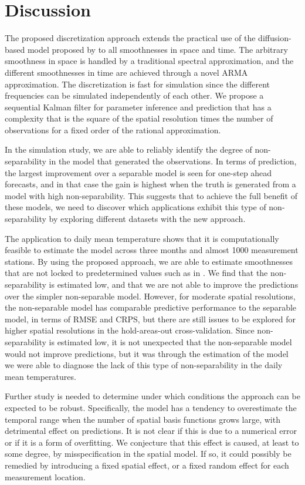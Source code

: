 \documentclass[12pt]{article} %
\begin{document}
\section{Discussion}\label{sec:Discussion}
The proposed discretization approach extends the practical use of the diffusion-based model proposed by \citet{LindgrenBakka} to all smoothnesses in space and time. The arbitrary smoothness in space is handled by a traditional spectral approximation, and the different smoothnesses in time are achieved through a novel ARMA approximation. The discretization is fast for simulation since the different frequencies can be simulated independently of each other. We propose a sequential Kalman filter for parameter inference and prediction that has a complexity that is the square of the spatial resolution times the number of observations for a fixed order of the rational approximation.  

In the simulation study, we are able to reliably identify the degree of non-separability in the model that generated the observations. In terms of prediction, the largest improvement over a separable model is seen for one-step ahead forecasts, and in that case the gain is highest when the truth is generated from a model with high non-separability. This suggests that to achieve the full benefit of these models, we need to discover which applications exhibit this type of non-separability by exploring different datasets with the new approach.

The application to daily mean temperature shows that it is computationally feasible to estimate the model across three months and almost 1000 measurement stations. By using the proposed approach, we are able to estimate smoothnesses that are not locked to predetermined values such as in \citet{LindgrenBakka}. We find that the non-separability is estimated low, and that we are not able to improve the predictions over the simpler non-separable model. However, for moderate spatial resolutions, the non-separable model has comparable predictive performance to the separable model, in terms of RMSE and CRPS, but there are still issues to be explored for higher spatial resolutions in the hold-areas-out cross-validation. Since non-separability is estimated low, it is not unexpected that the non-separable model would not improve predictions, but it was through the estimation of the model we were able to diagnose the lack of this type of non-separability in the daily mean temperatures. 

Further study is needed to determine under which conditions the approach can be expected to be robust. Specifically, the model has a tendency to overestimate the temporal range when the number of spatial basis functions grows large, with detrimental effect on predictions. It is not clear if this is due to a numerical error or if it is a form of overfitting. We conjecture that this effect is caused, at least to some degree, by misspecification in the spatial model. If so, it could possibly be remedied by introducing a fixed spatial effect, or a fixed random effect for each measurement location. 
\end{document}
